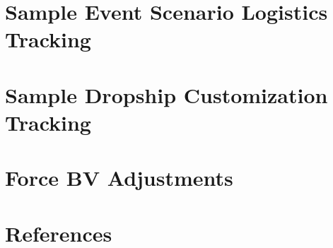 \documentclass{article}
\newcommand{\mysectiontitle}{}
\newcommand{\newsection}[2]{\renewcommand{\mysectiontitle}{#2}\section{#1}}
\begin{document}


\newpage

\newsection{Sample Event Scenario Logistics Tracking}{sample-logistics-event}



\newpage

\newsection{Sample Dropship Customization Tracking}{sample-dropship}



\newpage

\newsection{Force BV Adjustments}{bv-adjustments}
\label{sec:force_bv_adjustments}



\newpage

\newsection{References}{references}
\label{sec:references}



\newpage
\end{document}
